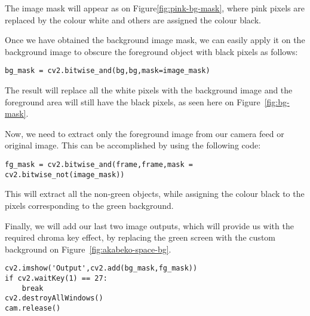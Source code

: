 \documentclass{labo}
\begin{document}
The image mask will appear as on Figure\ref{fig:pink-bg-mask}, where pink pixels are replaced by the colour white and others are assigned the colour black.


Once we have obtained the background image mask, we can easily apply it on the background image to obscure the foreground object with black pixels as follows:
\begin{verbatim}
bg_mask = cv2.bitwise_and(bg,bg,mask=image_mask)
\end{verbatim}

The result will replace all the white pixels with the background image and the foreground area will still have the black pixels, as seen here on Figure~\ref{fig:bg-mask}.


Now, we need to extract only the foreground image from our camera feed or original image. This can be accomplished by using the following code:
\begin{verbatim}
fg_mask = cv2.bitwise_and(frame,frame,mask = cv2.bitwise_not(image_mask))
\end{verbatim}
This will extract all the non-green objects, while assigning the colour black to the pixels corresponding to the green background.

Finally, we will add our last two image outputs, which will provide us with the required chroma key effect, by replacing the green screen with the custom background on Figure~\ref{fig:akabeko-space-bg}.
\begin{verbatim}
cv2.imshow('Output',cv2.add(bg_mask,fg_mask))
if cv2.waitKey(1) == 27:
	break
cv2.destroyAllWindows()
cam.release()
\end{verbatim}


\begin{figure}[h]
\centering
{}
\hfill
{}\\

\hfill
{}
\caption{}
\label{fig:clust-hier-geo}
\end{figure}
\end{document}
